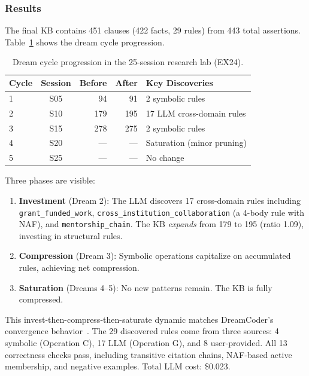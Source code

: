 \documentclass[10pt,conference]{IEEEtran}
\begin{document}
\subsubsection{Results}

The final KB contains 451 clauses (422 facts, 29 rules) from 443 total assertions. Table~\ref{tab:ex24_timeline} shows the dream cycle progression.

\begin{table}[t]
\centering
\caption{Dream cycle progression in the 25-session research lab (EX24).}
\label{tab:ex24_timeline}
\begin{tabular}{lcrrl}
\toprule
\textbf{Cycle} & \textbf{Session} & \textbf{Before} & \textbf{After} & \textbf{Key Discoveries} \\
\midrule
1 & S05 & 94  & 91  & 2 symbolic rules \\
2 & S10 & 179 & 195 & 17 LLM cross-domain rules \\
3 & S15 & 278 & 275 & 2 symbolic rules \\
4 & S20 & ---  & ---  & Saturation (minor pruning) \\
5 & S25 & ---  & ---  & No change \\
\bottomrule
\end{tabular}
\end{table}

Three phases are visible:
\begin{enumerate}
\item \textbf{Investment} (Dream 2): The LLM discovers 17 cross-domain rules including \texttt{grant\_funded\_work}, \texttt{cross\_institution\_collaboration} (a 4-body rule with NAF), and \texttt{mentorship\_chain}. The KB \emph{expands} from 179 to 195 (ratio 1.09), investing in structural rules.
\item \textbf{Compression} (Dream 3): Symbolic operations capitalize on accumulated rules, achieving net compression.
\item \textbf{Saturation} (Dreams 4--5): No new patterns remain. The KB is fully compressed.
\end{enumerate}

This invest-then-compress-then-saturate dynamic matches DreamCoder's convergence behavior~\cite{ellis2021dreamcoder}. The 29 discovered rules come from three sources: 4 symbolic (Operation C), 17 LLM (Operation G), and 8 user-provided. All 13 correctness checks pass, including transitive citation chains, NAF-based active membership, and negative examples. Total LLM cost: \$0.023.
\end{document}
